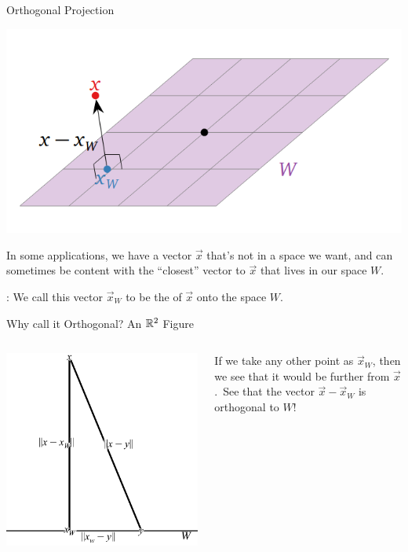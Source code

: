 \documentclass[xcoler=dvipsnames, aspectratio=169]{beamer}
\date{Orthogonal Projection}
\begin{document}
    \begin{frame}{Orthogonal Projection} %
        \begin{center}
            \includegraphics[width=.3\textwidth]{images/orthProj.png}
        \end{center}
        In some applications, we have a vector $\vec{x}$ that's not in a space we want, and can sometimes
        be content with the ``closest'' vector to $\vec{x}$ that lives in our space $W$.\pause
        \begin{defn}
            : We call this vector $\vec{x}_W$ to be the  of $\vec{x}$ onto the space $W$.
        \end{defn}
    \end{frame}
    \begin{frame}{Why call it Orthogonal? An $\mathbb{R}^2$ Figure}
        \begin{columns}
                \begin{center}
                    \includegraphics[height=.8\textheight]{images/orthProjEx2.png}
                \end{center}
            If we take any other point as $\vec{x}_W$, then we see that it would be further from 
            $\vec{x}$.\pause\ See that the vector $\vec{x}-\vec{x}_W$ is orthogonal to $W$!
        \end{columns}
    \end{frame}
\end{document}
